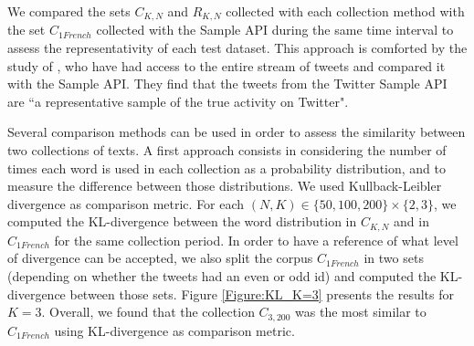 We compared the sets $C_{K,N}$ and $R_{K,N}$ collected with each collection method with the set $C_{1 French}$ collected with the Sample API during the same time interval to assess the representativity of each test dataset. This approach is comforted by the study of \citet{morstatter_when_2014}, who have had access to the entire stream of tweets and compared it with the Sample API. They find that the tweets from the Twitter Sample API are ``a representative sample of the true activity on Twitter".  


Several comparison methods can be used in order to assess the similarity between two collections of texts. A first approach consists in considering the number of times each word is used in each collection as a probability distribution, and to measure the difference between those distributions. We used Kullback-Leibler divergence \citep{kullback_information_1997} as comparison metric. For each $(N,K) \in  \{50, 100, 200\} \times \{2,3\}$, we computed the KL-divergence between the word distribution in $C_{K,N}$ and in $C_{1 French}$ for the same collection period. In order to have a reference of what level of divergence can be accepted, we also split the corpus $C_{1 French}$ in two sets (depending on whether the tweets had an even or odd id) and computed the KL-divergence between those sets. Figure \ref{Figure:KL_K=3} presents the results for $K=3$. Overall, we found that the collection $C_{3,200}$ was the most similar to $C_{1 French}$ using KL-divergence as comparison metric.


